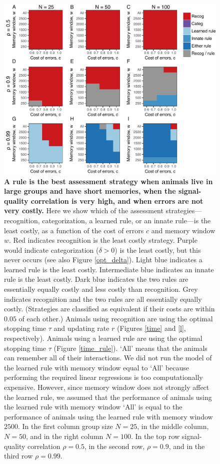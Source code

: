 \begin{figure}
\includegraphics[width=6.85in]{figures/best_type_of_learning.pdf}
\caption{\sffamily\small\textbf{A rule is the best assessment strategy when animals live in large groups and have short memories, when the signal-quality correlation is very high, and when errors are not very costly.} Here we show which of the assessment strategies---recognition, categorization, a learned rule, or an innate rule---is the least costly, as a function of the cost of errors $c$ and memory window $w$. Red indicates recognition is the least costly strategy. Purple would indicate categorization ($\delta>0$) is the least costly, but this never occurs (see also Figure \ref{opt_delta}). Light blue indicates a learned rule is the least costly. Intermediate blue indicates an innate rule is the least costly. Dark blue indicates the two rules are essentially equally costly and less costly than recognition. Grey indicates recognition and the two rules are all essentially equally costly. (Strategies are classified as equivalent if their costs are within $0.05$ of each other.) Animals using recognition are using the optimal stopping time $\tau$ and updating rate $r$ (Figures \ref{time} and \ref{l}, respectively). Animals using a learned rule are using the optimal stopping time $\tau$ (Figure \ref{time_rule}). `All' means that the animals can remember all of their interactions. We did not run the model of the learned rule with memory window equal to `All' because performing the required linear regressions is too computationally expensive. However, since memory window does not strongly affect the learned rule, we assumed that the performance of animals using the learned rule with memory window `All' is equal to the performance of animals using the learned rule with memory window $2500$. In the first column group size $N=25$, in the middle column, $N=50$, and in the right column $N=100$. In the top row signal-quality correlation $\rho=0.5$, in the second row, $\rho=0.9$, and in the third row $\rho=0.99$.}
\label{best}
\end{figure}

